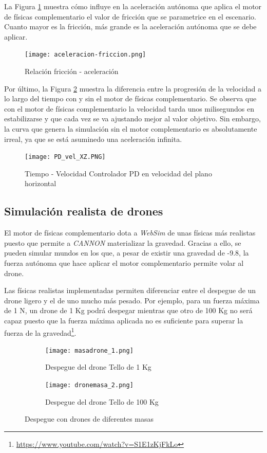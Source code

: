 La Figura \ref{fig:friccion-acele} muestra cómo influye en la aceleración autónoma que aplica el motor de físicas complementario el valor de fricción que se parametrice en el escenario. Cuanto mayor es la fricción, más grande es la aceleración autónoma que se debe aplicar.
\newpage
\begin{figure}[h!]
    \centering
    \texttt{[image: aceleracion-friccion.png]}
    \caption{Relación fricción - aceleración}
    \label{fig:friccion-acele}
\end{figure}

Por último, la Figura \ref{fig:vel-planoXZ} muestra la diferencia entre la progresión de la velocidad a lo largo del tiempo con y sin el motor de físicas complementario. Se observa que con el motor de físicas complementario la velocidad tarda unos milisegundos en estabilizarse y que cada vez se va ajustando mejor al valor objetivo. Sin embargo, la curva que genera la simulación sin el motor complementario es absolutamente irreal, ya que se está asuminedo una aceleración infinita.

\begin{figure}[h!]
    \centering
    \texttt{[image: PD\_vel\_XZ.PNG]}
    \caption{Tiempo - Velocidad Controlador PD en velocidad del plano horizontal}
    \label{fig:vel-planoXZ}
\end{figure}

\newpage
\subsection{Simulación realista de drones}
El motor de físicas complementario dota a \textit{WebSim} de unas físicas más realistas puesto que permite a \textit{CANNON} materializar la gravedad. Gracias a ello, se pueden simular mundos en los que, a pesar de existir una gravedad de -9.8, la fuerza autónoma que hace aplicar el motor complementario permite volar al drone. \newline

Las físicas realistas implementadas permiten diferenciar entre el despegue de un drone ligero y el de uno mucho más pesado. Por ejemplo, para un fuerza máxima de 1 N, un drone de 1 Kg podrá despegar mientras que otro de 100 Kg no será capaz puesto que la fuerza máxima aplicada no es suficiente para superar la fuerza de la gravedad\footnote{\url{https://www.youtube.com/watch?v=S1E1zKjFkLo}}.

\begin{figure}[h!]
  \centering
  \begin{subfigure}[b]{\textwidth}
    \texttt{[image: masadrone\_1.png]}
    \caption{Despegue del drone Tello de 1 Kg}
  \end{subfigure}
  \hfill
  \begin{subfigure}[b]{\textwidth}
    \texttt{[image: dronemasa\_2.png]}
    \caption{Despegue del drone Tello de 100 Kg}
  \end{subfigure}
\caption{Despegue con drones de diferentes masas}
\label{fig:masadrone}
\end{figure}


